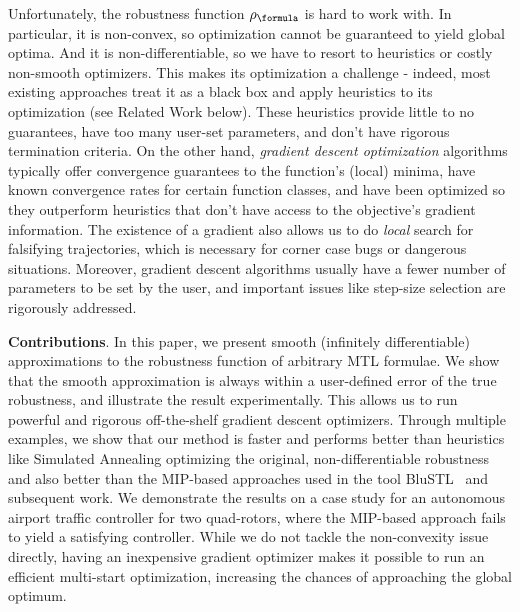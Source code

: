 Unfortunately, the robustness function $\robf$ is hard to work with.
In particular, it is non-convex, so optimization cannot be guaranteed to yield global optima.
And it is non-differentiable, so we have to resort to heuristics or costly non-smooth optimizers. 
This makes its optimization a challenge - indeed, most existing approaches treat it as a black box and apply heuristics to its optimization (see Related Work below).
These heuristics provide little to no guarantees, have too many user-set parameters, and don't have rigorous termination criteria.
On the other hand, \textit{gradient descent optimization} algorithms typically offer convergence guarantees to the function's (local) minima, have known convergence rates for certain function classes, and have been optimized so they outperform heuristics that don't have access to the objective's gradient information.
The existence of a gradient also allows us to do \textit{local} search for falsifying trajectories, which is necessary for corner case bugs or dangerous situations.
Moreover, gradient descent algorithms usually have a fewer number of parameters to be set by the user, and important issues like step-size selection are rigorously addressed.

\textbf{Contributions}. In this paper, we present smooth (infinitely differentiable) approximations to the robustness function of arbitrary MTL formulae.
We show that the smooth approximation is always within a user-defined error of the true robustness, and illustrate the result experimentally.
This allows us to run powerful and rigorous off-the-shelf gradient descent optimizers.
Through multiple examples, we show that our method is faster and performs better than heuristics like Simulated Annealing optimizing the original, non-differentiable robustness and also better than the MIP-based approaches used in the tool BluSTL~\cite{Raman14_MPCSTL} and subsequent work. 
We demonstrate the results on a case study for an autonomous airport traffic controller for two quad-rotors, where the MIP-based approach fails to yield a satisfying controller.
While we do not tackle the non-convexity issue directly, having an inexpensive gradient optimizer makes it possible to run an efficient multi-start optimization, increasing the chances of approaching the global optimum.

